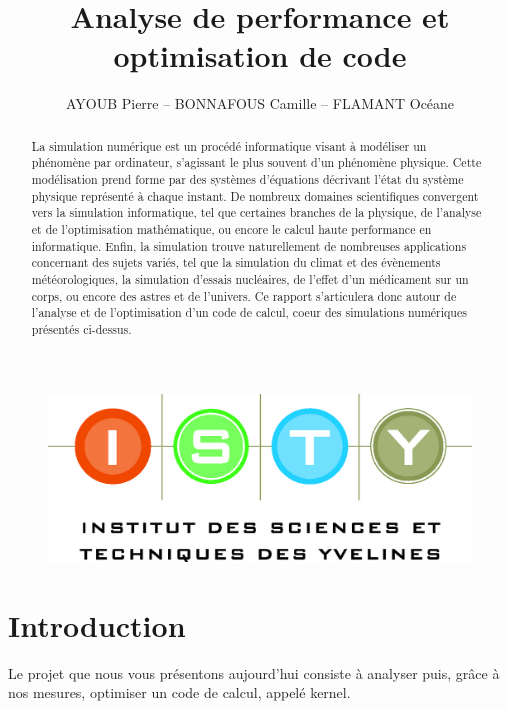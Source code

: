 \documentclass[12pt,a4paper]{article}
\begin{document}
\title{Analyse de performance et optimisation de code}
\author{AYOUB Pierre -- BONNAFOUS Camille -- FLAMANT Océane}

\maketitle

\begin{figure}[b]
    \centering
    \includegraphics[scale=0.3]{figures/isty.jpg}
\end{figure}

\newpage
\begin{abstract}

La simulation numérique est un procédé informatique visant à modéliser un
phénomène par ordinateur, s'agissant le plus souvent d'un phénomène
physique. Cette modélisation prend forme par des systèmes d'équations
décrivant l'état du système physique représenté à chaque instant. De
nombreux domaines scientifiques convergent vers la simulation
informatique, tel que certaines branches de la physique, de l'analyse
et de l'optimisation mathématique, ou encore le calcul haute
performance en informatique. Enfin, la simulation trouve naturellement
de nombreuses applications concernant des sujets variés, tel que la
simulation du climat et des évènements météorologiques, la simulation
d'essais nucléaires, de l'effet d'un médicament sur un corps, ou encore
des astres et de l'univers. Ce rapport s'articulera donc autour de l'analyse et
de l'optimisation d'un code de calcul, coeur des simulations numériques
présentés ci-dessus.

\end{abstract}

\tableofcontents

\section{Introduction}

Le projet que nous vous présentons aujourd'hui consiste à analyser puis,
grâce à nos mesures, optimiser un code de calcul, appelé kernel.
\end{document}
